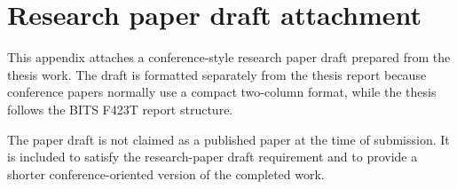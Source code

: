 \chapter{Research paper draft attachment}

This appendix attaches a conference-style research paper draft prepared from the thesis work. The draft is formatted separately from the thesis report because conference papers normally use a compact two-column format, while the thesis follows the BITS F423T report structure.

The paper draft is not claimed as a published paper at the time of submission. It is included to satisfy the research-paper draft requirement and to provide a shorter conference-oriented version of the completed work.

\clearpage

